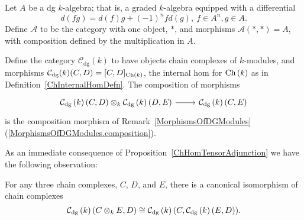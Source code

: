 \documentclass[dissertation.tex]{subfiles}
\begin{document}
        \begin{eg}
          \begin{description}[style=nextline]
          \item[dg category with one object]
            Let $A$ be a dg $k$-algebra; that is, a graded $k$-algebra equipped with a differential
            $$d(fg) = d(f)g + (-1)^nfd(g),\ f \in A^n, g \in A.$$
            Define $\mathscr{A}$ to be the category with one object, $\ast$, and morphisms $\mathscr{A}(\ast, \ast) = A$, with composition defined by the multiplication in $A$.
          \item[dg $k$-modules]
            Define the category $\mathcal{C}_\text{dg}(k)$ to have objects chain complexes of $k$-modules, and morphisms $\mathcal{C}_\text{dg}(k)(C,D) = [C,D]_{\operatorname{Ch}\left(k\right)}$, the internal hom for $\operatorname{Ch}\left(k\right)$ as in Definition~\ref{ChInternalHomDefn}.
            The composition of morphisms
            $$\begin{tikzcd}
              \cdg{k}(C,D) \otimes_k \cdg{k}(D,E) \arrow{r} & \cdg{k}(C,E)
            \end{tikzcd}$$
            is the composition morphism of Remark~\ref{MorphismsOfDGModules} (\ref{MorphismsOfDGModules.composition}).
            
            As an immediate consequence of Proposition~\ref{ChHomTensorAdjunction} we have the following observation:
            \begin{prop}
              For any three chain complexes, $C$, $D$, and $E$, there is a canonical isomorphism of chain complexes
              $$\mathcal{C}_\text{dg}\left(k\right)(C \otimes_k E, D) \cong \mathcal{C}_\text{dg}\left(k\right)(C,\mathcal{C}_\text{dg}\left(k\right)(E,D)).$$
              

\end{prop}
\end{description}
\end{eg}
\end{document}

